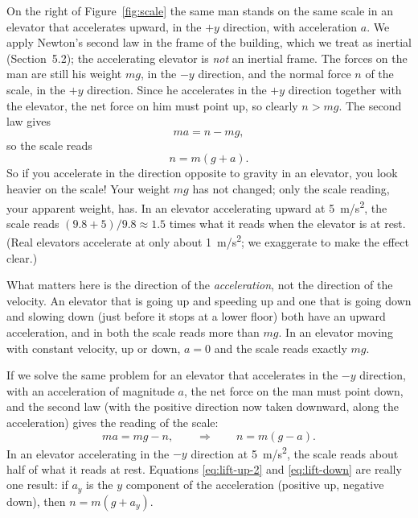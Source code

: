\documentclass[11pt,a4paper]{article}
\begin{document}
On the right of Figure~\ref{fig:scale} the same man stands on the same scale in an elevator that
accelerates upward, in the $+y$ direction, with acceleration $a$. We apply Newton's second law in
the frame of the building, which we treat as inertial (Section~5.2); the accelerating elevator is
\emph{not} an inertial frame. The forces on the man are still his weight $mg$, in the $-y$
direction, and the normal force $n$ of the scale, in the $+y$ direction. Since he accelerates in the
$+y$ direction together with the elevator, the net force on him must point up, so clearly $n > mg$.
The second law gives
\begin{equation}\label{eq:lift-up-1}
  ma = n - mg ,
\end{equation}
so the scale reads
\begin{equation}\label{eq:lift-up-2}
  n = m(g + a) .
\end{equation}
So if you accelerate in the direction opposite to gravity in an elevator, you look heavier on the
scale! Your weight $mg$ has not changed; only the scale reading, your apparent weight, has. In an
elevator accelerating upward at \qty{5}{m/s^2}, the scale reads $(9.8+5)/9.8 \approx 1.5$ times
what it reads when the elevator is at rest. (Real elevators accelerate at only about
\qty{1}{m/s^2}; we exaggerate to make the effect clear.)

What matters here is the direction of the \emph{acceleration}, not the direction of the velocity.
An elevator that is going up and speeding up and one that is going down and slowing down (just
before it stops at a lower floor) both have an upward acceleration, and in both the scale reads
more than $mg$. In an elevator moving with constant velocity, up or down, $a = 0$ and the scale
reads exactly $mg$.

If we solve the same problem for an elevator that accelerates in the $-y$ direction, with an
acceleration of magnitude $a$, the net force on the man must point down, and the second law (with
the positive direction now taken downward, along the acceleration) gives the reading of the scale:
\begin{equation}\label{eq:lift-down}
  ma = mg - n , \qquad \Rightarrow \qquad n = m(g - a) .
\end{equation}
In an elevator accelerating in the $-y$ direction at \qty{5}{m/s^2}, the scale reads about half of
what it reads at rest. Equations \eqref{eq:lift-up-2} and \eqref{eq:lift-down} are really one
result: if $a_y$ is the $y$ component of the acceleration (positive up, negative down), then
$n = m(g + a_y)$.
\end{document}
